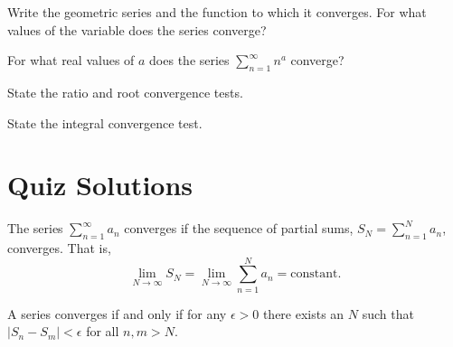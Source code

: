 \begin{QuizProblem}
  \label{quiz problem geometric series}
  Write the geometric series and the function to which it converges.  
  For what values of the variable does the series converge?

\end{QuizProblem}


\begin{QuizProblem}
  \label{quiz problem convergence na}
  For what real values of $a$ does the series $\sum_{n=1}^\infty n^a$ converge?

\end{QuizProblem}


\begin{QuizProblem}
  \label{quiz problem ratio root convergence}
  State the ratio and root convergence tests.

\end{QuizProblem}


\begin{QuizProblem}
  \label{quiz problem integral convergence test}
  State the integral convergence test.

\end{QuizProblem}







\raggedbottom
\pagebreak
\flushbottom
\section{Quiz Solutions}


\begin{QuizSolution}
  \label{quiz solution definition convergence series}
  The series $\sum_{n=1}^\infty a_n$ converges if the sequence of partial sums,
  $S_N = \sum_{n=1}^{N} a_n$,
  converges.  That is,
  \[
  \lim_{N \to \infty} S_N =
  \lim_{N \to \infty} \sum_{n=1}^N a_n = \mathrm{constant}.
  \]
\end{QuizSolution}


\begin{QuizSolution}
  \label{quiz solution Cauchy convergence series}
  A series converges if and only if for any $\epsilon > 0$ there
  exists an $N$ such that $|S_n - S_m| < \epsilon$ for all $n,m > N$.
\end{QuizSolution}


